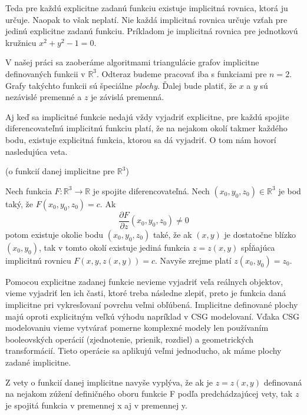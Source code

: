 Teda pre každú explicitne zadanú funkciu existuje implicitná rovnica, ktorá ju určuje.
Naopak to však neplatí. Nie každá implicitná rovnica určuje vzťah pre jedinú explicitne zadanú
funkciu. Príkladom je implicitná rovnica pre jednotkovú kružnicu $x^2 + y^2 - 1 = 0$. 


V našej práci sa zaoberáme algoritmami triangulácie grafov implicitne definovaných funkcii v 
$\mathbb{R}^3$. Odteraz
budeme pracovať iba s funkciami pre $n = 2$. Grafy takýchto funkcii sú špeciálne \textit{plochy}. 
Ďalej bude platiť, že $x$ a $y$ sú nezávislé premenné a $z$ je závislá premenná.


Aj keď sa implicitné funkcie nedajú vždy vyjadriť explicitne, pre každú spojite diferencovateľnú
implicitnú funkciu platí, že na nejakom okolí takmer každého bodu, existuje explicitná funkcia,
ktorou sa dá vyjadriť.
O tom nám hovorí nasledujúca veta.





\begin{theorem}
 (o funkcií danej implicitne pre $\mathbb{R}^3$)
 
 Nech funkcia $F: \mathbb{R}^3 \to \mathbb{R}$ je spojite diferencovateľná. 
 Nech $(x_0, y_0, z_0) \in \mathbb{R}^3$ je bod taký, že $F(x_0, y_0, z_0) = c$.
 Ak $$\frac{\partial F}{\partial z} (x_0, y_0, z_0) \neq 0$$ potom existuje okolie 
 bodu $(x_0, y_0, z_0)$ také, že ak $(x, y)$ je dostatočne blízko $(x_0, y_0)$, 
 tak v tomto okolí existuje jediná funkcia $z = z(x ,y)$ spĺňajúca implicitnú rovnicu
 $F(x, y, z(x, y)) = c$. Navyše zrejme platí $z(x_0, y_0) = z_0$.
\end{theorem}

Pomocou explicitne zadanej funkcie nevieme vyjadriť veľa reálnych objektov, 
vieme vyjadriť len ich časti, ktoré treba následne zlepiť, 
preto je funkcia daná implicitne pri vykresľovaní povrchu veľmi obľúbená. 
Implicitne definované plochy majú oproti explicitným veľkú výhodu napríklad
v CSG modelovaní. Vďaka CSG modelovaniu vieme vytvárať pomerne komplexné
modely len používaním booleovských operácií (zjednotenie, prienik, rozdiel)
a geometrických transformácií. Tieto operácie sa aplikujú veľmi jednoducho, ak
máme plochy zadané implicitne.


\begin{note}
    Z vety o funkcií danej implicitne navyše vyplýva, že ak je $z = z(x,y)$ definovaná na nejakom 
    zúžení definičného oboru funkcie F podľa predchádzajúcej vety, tak $z$ je spojitá funkcia v 
    premennej x aj v premennej y. 
\end{note}

